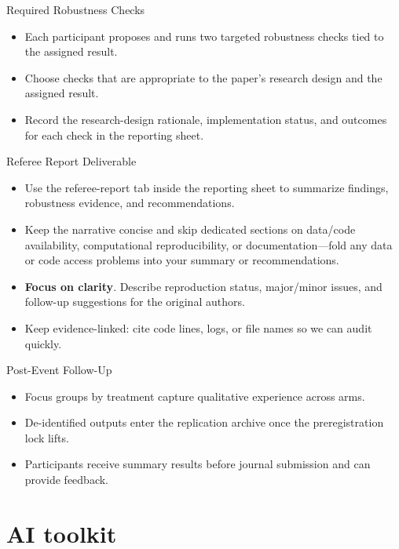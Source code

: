 \documentclass[aspectratio=169,professionalfonts]{beamer}
\begin{document}
\begin{frame}{Required Robustness Checks}
  \begin{itemize}
    \item Each participant proposes and runs two targeted robustness checks tied to the assigned result.
    \item Choose checks that are appropriate to the paper's research design and the assigned result.
    \item Record the research-design rationale, implementation status, and outcomes for each check in the reporting sheet.
  \end{itemize}
\end{frame}

\begin{frame}{Referee Report Deliverable}
  \begin{itemize}
    \item Use the referee-report tab inside the reporting sheet to summarize findings, robustness evidence, and recommendations.
    \item Keep the narrative concise and skip dedicated sections on data/code availability, computational reproducibility, or documentation—fold any data or code access problems into your summary or recommendations.
    \item \textbf{Focus on clarity}. Describe reproduction status, major/minor issues, and follow-up suggestions for the original authors.
    \item Keep evidence-linked: cite code lines, logs, or file names so we can audit quickly.
  \end{itemize}
\end{frame}

\begin{frame}{Post-Event Follow-Up}
  \begin{itemize}
    \item Focus groups by treatment capture qualitative experience across arms.
    \item De-identified outputs enter the replication archive once the preregistration lock lifts.
    \item Participants receive summary results before journal submission and can provide feedback.
  \end{itemize}
\end{frame}

\section{AI toolkit}
\end{document}

